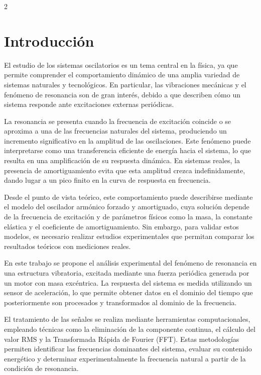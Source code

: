 \documentclass[10pt]{article}
\begin{document}
\begin{multicols}{2}
\section{Introducción}

El estudio de los sistemas oscilatorios es un tema central en la física, ya que permite comprender el comportamiento dinámico de una amplia variedad de sistemas naturales y tecnológicos. En particular, las vibraciones mecánicas y el fenómeno de resonancia son de gran interés, debido a que describen cómo un sistema responde ante excitaciones externas periódicas.

La resonancia se presenta cuando la frecuencia de excitación coincide o se aproxima a una de las frecuencias naturales del sistema, produciendo un incremento significativo en la amplitud de las oscilaciones. Este fenómeno puede interpretarse como una transferencia eficiente de energía hacia el sistema, lo que resulta en una amplificación de su respuesta dinámica. En sistemas reales, la presencia de amortiguamiento evita que esta amplitud crezca indefinidamente, dando lugar a un pico finito en la curva de respuesta en frecuencia.

Desde el punto de vista teórico, este comportamiento puede describirse mediante el modelo del oscilador armónico forzado y amortiguado, cuya solución depende de la frecuencia de excitación y de parámetros físicos como la masa, la constante elástica y el coeficiente de amortiguamiento. Sin embargo, para validar estos modelos, es necesario realizar estudios experimentales que permitan comparar los resultados teóricos con mediciones reales.

En este trabajo se propone el análisis experimental del fenómeno de resonancia en una estructura vibratoria, excitada mediante una fuerza periódica generada por un motor con masa excéntrica. 
La respuesta del sistema es medida utilizando un sensor de aceleración, lo que permite obtener datos en el dominio del tiempo que posteriormente son procesados y transformados al dominio de la frecuencia.

El tratamiento de las señales se realiza mediante herramientas computacionales, empleando técnicas como la eliminación de la componente continua, el cálculo del valor RMS y la Transformada Rápida de Fourier (FFT). Estas metodologías permiten identificar las frecuencias dominantes del sistema, evaluar su contenido energético y determinar experimentalmente la frecuencia natural a partir de la condición de resonancia.


\end{multicols}
\end{document}
